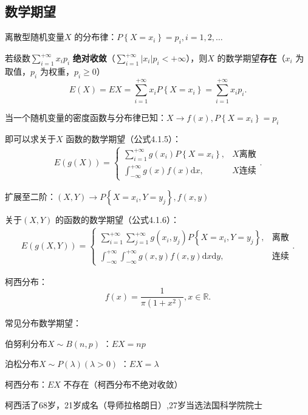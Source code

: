 \subsection{数学期望}%
\label{sub:数学期望}
\begin{defi}
    离散型随机变量$X$ 的分布律：$P\left\{ X=x_i \right\} =p_i,i=1,2,\ldots$ 

    若级数${\sum_{i=1}^{+\infty} x_ip_i}$ \textbf{绝对收敛}（${\sum_{i=1}^{+\infty} \left| x_i \right| p_i<+\infty}$），则$X$ 的数学期望\textbf{存在}（$x_i$ 为取值，$p_i$ 为权重，$p_i\ge 0$）
    \[
        E\left( X \right) =EX=\sum_{i=1}^{+\infty} x_iP\left\{ X=x_i \right\} =\sum_{i=1}^{+\infty} x_ip_i
    .\] 
\end{defi}
\begin{rrule}
    当一个随机变量的密度函数与分布律已知：$X\to f\left( x \right),P\left\{ X=x_i \right\} =p_i $

    即可以求关于$X$ 函数的数学期望（公式4.1.5）：
    \begin{align*}
        E\left( g\left( X \right)  \right) =\begin{cases}
            {\sum_{i=1}^{+\infty} g\left( x_i \right) P\left\{ X=x_i \right\} },&X\text{离散}\\
            {\int_{-\infty}^{+\infty} g\left( x \right) f\left( x \right)  \mathrm{d}x},&X\text{连续}
        \end{cases}
    .\end{align*}
\end{rrule}
\begin{rrule}
    扩展至二阶：$\left( X,Y \right) \to P\left\{ X=x_{i},Y=y_{j} \right\} ,f\left( x,y \right) $ 

    关于$\left( X,Y \right) $ 的函数的数学期望（公式4.1.6）：
    \begin{align*}
        E\left( g\left( X,Y \right)  \right) =\begin{cases}
            {\sum_{i=1}^{+\infty}{\sum_{j=1}^{+\infty} g\left( x_{i},y_{j} \right) P\left\{ X=x_{i},Y=y_{j} \right\}} },&\text{离散}\\
            {\int_{-\infty}^{+\infty}{\int_{-\infty}^{+\infty} g\left( x,y \right) f\left( x,y \right)  \mathrm{d}x} \mathrm{d}y},&\text{连续}
        \end{cases}
    .\end{align*}
\end{rrule}
\begin{notation}
    柯西分布：\[
        f\left( x \right) =\frac{1}{\pi\left( 1+x^2 \right) },x\in \mathbb{R}
    .\] 
\end{notation}
常见分布数学期望：
\begin{notation}
    伯努利分布$X\sim B\left( n,p \right) $ ：$EX=np$ 

    泊松分布$X\sim P\left( \lambda \right) \left( \lambda>0 \right) $ ：$EX=\lambda$ 

    柯西分布：$EX$ 不存在（柯西分布不绝对收敛）
\end{notation}
\begin{notation}
    柯西活了68岁，21岁成名（导师拉格朗日）,27岁当选法国科学院院士
\end{notation}



